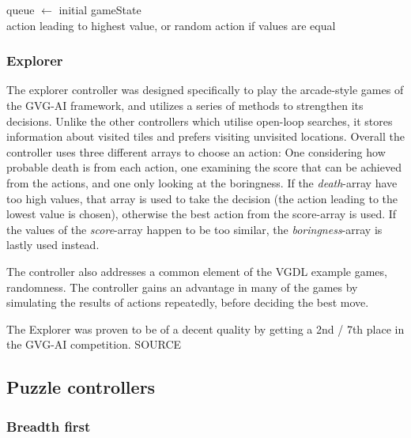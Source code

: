 \documentclass[a4paper,titlepage,final]{report}
\begin{document}
\begin{algorithm}[H]
queue $\gets$ initial gameState \\
\Return action leading to highest value, or random action if values are equal
\end{algorithm}

\subsubsection*{Explorer}
The explorer controller was designed specifically to play the arcade-style games of the GVG-AI framework, and utilizes a series of methods to strengthen its decisions. 
Unlike the other controllers which utilise open-loop searches, it stores information about visited tiles and prefers visiting unvisited locations. 
Overall the controller uses three different arrays to choose an action: One considering how probable death is from each action, one examining the score that can be achieved from the actions, and one only looking at the boringness.
If the \textit{death}-array have too high values, that array is used to take the decision (the action leading to the lowest value is chosen), otherwise the best action from the score-array is used.
If the values of the \textit{score}-array happen to be too similar, the \textit{boringness}-array is lastly used instead.

The controller also addresses a common element of the VGDL example games, randomness. The controller gains an advantage in many of the games by simulating the results of actions repeatedly, before deciding the best move.

The Explorer was proven to be of a decent quality by getting a 2nd / 7th place in the GVG-AI competition. SOURCE

\subsection{Puzzle controllers}

\subsubsection*{Breadth first}
\end{document}
